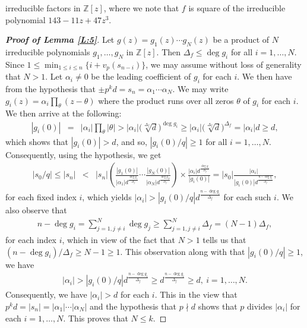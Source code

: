 \documentclass[12pt]{amsart}%
\begin{document}
irreducible factors in $\mathbb{Z}[z]$, where we note that $f$ is square of the irreducible polynomial $143-11z+47z^3$.
\begin{proof}[\bf Proof of Lemma \ref{L:5}]
Let $g(z)=g_1(z)\cdots g_N(z)$ be a product of $N$ irreducible polynomials $g_1,\ldots,g_N$ in $\mathbb{Z}[z]$. Then $\Delta_f\leq \deg g_i$ for all $i=1,\ldots,N$. Since $1\leq \min_{1\leq i\leq n}\{i+v_p(s_{n-i})\}$, we may assume without loss of generality that $N>1$. Let $\alpha_i\neq 0$ be the leading coefficient of $g_i$ for each $i$. We then have from the hypothesis that $\pm p^kd=s_n=\alpha_1\cdots \alpha_N$. We may write $g_i(z)=\alpha_i\prod_{\theta}(z-\theta)$ where the product runs over all zeros $\theta$ of $g_i$ for each $i$. We then arrive at the following:
\begin{eqnarray*}
|g_i(0)| &=& |\alpha_i|\prod_{\theta}|\theta|>  |\alpha_i|\bigl(\sqrt[\Delta_f]{d}\bigr)^{\deg g_i}\geq |\alpha_i|\bigl(\sqrt[\Delta_f]{d}\bigr)^{\Delta_f}=|\alpha_i|d\geq d,
\end{eqnarray*}
which shows that $|g_i(0)|>d$, and so, $|g_i(0)/q|\geq 1$ for all $i=1,\ldots, N$. Consequently, using the hypothesis, we get
\begin{eqnarray*}
|s_0/q| \leq |s_n|&<&|s_n|\left({\frac{|g_1(0)|}{|\alpha_1|d^{\frac{\deg g_1}{\Delta_f}}}\cdots \frac{|g_N(0)|}{|\alpha_N|d^{\frac{\deg g_N}{\Delta_f}}}}\right)\times \frac{|\alpha_i|d^{\frac{\deg g_i}{\Delta_f}}}{|g_i(0)|}
= |s_0|\frac{|\alpha_i|}{|g_i(0)|d^{\frac{n-\deg g_i}{\Delta_f}}},
\end{eqnarray*}
for each fixed index $i$, which yields $|\alpha_i|> |g_i(0)/q|d^{\frac{n-\deg g_i}{\Delta_f}}$ for each such $i$. We also
observe that
\begin{eqnarray*}
n-\deg g_i=\sum_{j=1,j\neq i}^{N} \deg g_j\geq \sum_{j=1,j\neq i}^{N}\Delta_f=(N-1)\Delta_f,
\end{eqnarray*}
for each index $i$, which in view of the fact that $N>1$ tells us that $(n-\deg g_i)/\Delta_f\geq N-1\geq 1$. This observation along with that $|g_i(0)/q|\geq 1$, we have
\begin{eqnarray*}
|\alpha_i|>|g_i(0)/q|d^{\frac{n-\deg g_i}{\Delta_f}}\geq d^{\frac{n-\deg g_i}{\Delta_f}}\geq d,~i=1,\ldots,N.
\end{eqnarray*}
Consequently, we have $|\alpha_i|>d$ for each $i$. This in the view that $p^k d=|s_n|=|\alpha_1|\cdots |\alpha_N|$ and the hypothesis that $p\nmid d$ shows that $p$ divides $|\alpha_i|$ for each $i=1,\ldots, N$. This proves that $N\leq k$.


\end{proof}
\end{document}
